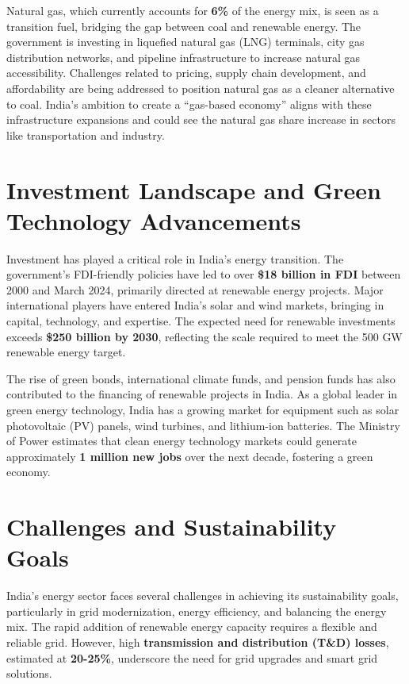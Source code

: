 \documentclass[12pt]{article}
\begin{document}
\begin{spacing}{1.5}
Natural gas, which currently accounts for \textbf{6\%} of the energy mix, is seen as a transition fuel, bridging the gap between coal and renewable energy. The government is investing in liquefied natural gas (LNG) terminals, city gas distribution networks, and pipeline infrastructure to increase natural gas accessibility. Challenges related to pricing, supply chain development, and affordability are being addressed to position natural gas as a cleaner alternative to coal. India’s ambition to create a “gas-based economy” aligns with these infrastructure expansions and could see the natural gas share increase in sectors like transportation and industry.

\section*{Investment Landscape and Green Technology Advancements}
Investment has played a critical role in India’s energy transition. The government’s FDI-friendly policies have led to over \textbf{\$18 billion in FDI} between 2000 and March 2024, primarily directed at renewable energy projects. Major international players have entered India’s solar and wind markets, bringing in capital, technology, and expertise. The expected need for renewable investments exceeds \textbf{\$250 billion by 2030}, reflecting the scale required to meet the 500 GW renewable energy target.

The rise of green bonds, international climate funds, and pension funds has also contributed to the financing of renewable projects in India. As a global leader in green energy technology, India has a growing market for equipment such as solar photovoltaic (PV) panels, wind turbines, and lithium-ion batteries. The Ministry of Power estimates that clean energy technology markets could generate approximately \textbf{1 million new jobs} over the next decade, fostering a green economy.

\section*{Challenges and Sustainability Goals}
India’s energy sector faces several challenges in achieving its sustainability goals, particularly in grid modernization, energy efficiency, and balancing the energy mix. The rapid addition of renewable energy capacity requires a flexible and reliable grid. However, high \textbf{transmission and distribution (T\&D) losses}, estimated at \textbf{20-25\%}, underscore the need for grid upgrades and smart grid solutions.


\end{spacing}
\end{document}
